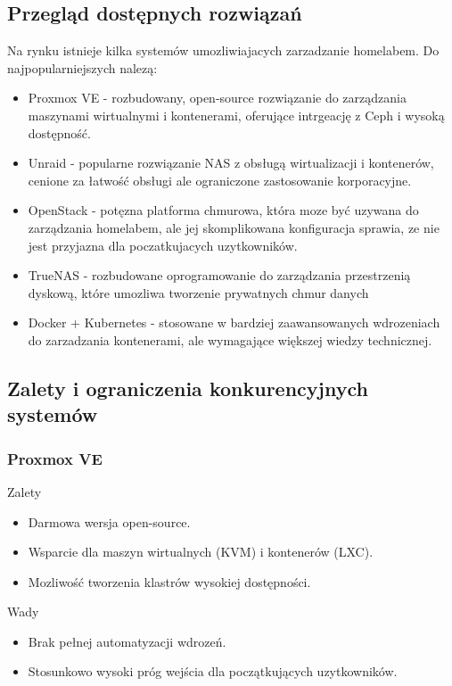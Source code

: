\subsection{Przegląd dostępnych rozwiązań}
Na rynku istnieje kilka systemów umozliwiajacych zarzadzanie homelabem. Do najpopularniejszych nalezą:
\begin{itemize}
    \item Proxmox VE \cite{Proxmox} - rozbudowany, open-source rozwiązanie do zarządzania maszynami wirtualnymi i kontenerami, oferujące intrgeację z Ceph i wysoką dostępność.
    \item Unraid \cite{Unraid} - popularne rozwiązanie NAS z obsługą wirtualizacji i kontenerów, cenione za łatwość obsługi ale ograniczone zastosowanie korporacyjne.
    \item OpenStack \cite{OpenStack} - potęzna platforma chmurowa, która moze być uzywana do zarządzania homelabem, ale jej skomplikowana konfiguracja sprawia, ze nie jest przyjazna dla poczatkujacych uzytkowników.
    \item TrueNAS \cite{TrueNAS} - rozbudowane oprogramowanie do zarządzania przestrzenią dyskową, które umozliwa tworzenie prywatnych chmur danych
    \item Docker \cite{Docker} + Kubernetes \cite{Kubernetes} - stosowane w bardziej zaawansowanych wdrozeniach do zarzadzania kontenerami, ale wymagające większej wiedzy technicznej.
\end{itemize}
\subsection{Zalety i ograniczenia konkurencyjnych systemów}

\subsubsection{Proxmox VE \cite{Proxmox}}
\begin{minipage}{0.45\textwidth}
    Zalety
    \begin{itemize}
        \item Darmowa wersja open-source.
        \item Wsparcie dla maszyn wirtualnych (KVM) i kontenerów (LXC).
        \item Mozliwość tworzenia klastrów wysokiej dostępności.
    \end{itemize}
\end{minipage}\hfil
\begin{minipage}{0.45\textwidth}
    Wady
    \begin{itemize}
        \item Brak pełnej automatyzacji wdrozeń.
        \item Stosunkowo wysoki próg wejścia dla początkujących uzytkowników.
    \end{itemize}
\end{minipage}

